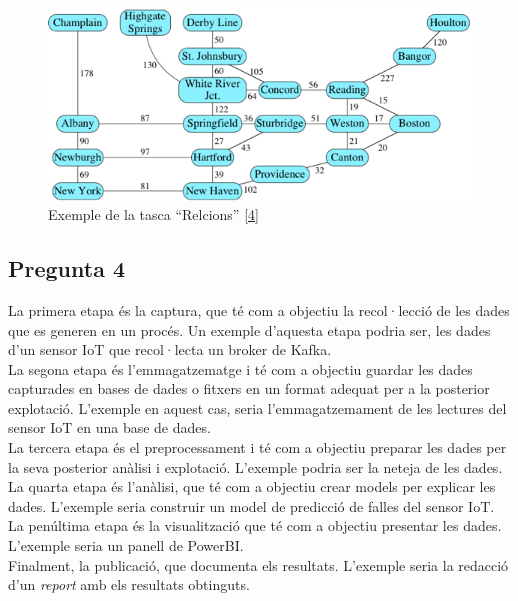 \documentclass[a4paper,12pt]{report}
\begin{document}
\begin{figure}
    \centering
    \includegraphics[scale =1.3]{images/8aa21944eef2879cea9080a2ae2fbcb98cec0ddf.png}
    \caption{Exemple de la tasca ``Relcions'' \protect\hyperlink{ref:biblio-relacions}{[4]}}
    \label{fig:relacions}
\end{figure}
\newpage
\subsection*{Pregunta 4}
La primera etapa és la captura, que té com a objectiu la recol·lecció de les dades que es generen en un procés. Un exemple d'aquesta etapa podria ser, les dades d'un sensor IoT que recol·lecta un broker de Kafka.\\
La segona etapa és l'emmagatzematge i té com a objectiu guardar les dades capturades en bases de dades o fitxers en un format adequat per a la posterior explotació. L'exemple en aquest cas, seria l'emmagatzemament de les lectures del sensor IoT en una base de dades.\\
La tercera etapa és el preprocessament i té com a objectiu preparar les dades per la seva posterior anàlisi i explotació. L'exemple podria ser la neteja de les dades.\\
La quarta etapa és l'anàlisi, que té com a objectiu crear models per explicar les dades. L'exemple seria construir un model de predicció de falles del sensor IoT.\\
La penúltima etapa és la visualització que té com a objectiu presentar les dades. L'exemple seria un panell de PowerBI.\\
Finalment, la publicació, que documenta els resultats. L'exemple seria la redacció d'un \textit{report} amb els resultats obtinguts.
\end{document}
